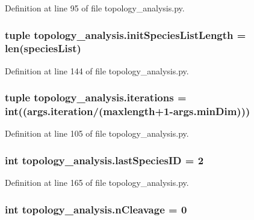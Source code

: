 Definition at line 95 of file topology\+\_\+analysis.\+py.

\hypertarget{a00159_af2370a811b14632a793a28e451be8150}{
\subsubsection[{init\+Species\+List\+Length}]{\setlength{\rightskip}{0pt plus 5cm}tuple topology\+\_\+analysis.\+init\+Species\+List\+Length = len({\bf species\+List})}}\label{a00159_af2370a811b14632a793a28e451be8150}


Definition at line 144 of file topology\+\_\+analysis.\+py.

\hypertarget{a00159_a2117e01e4647cbdecc0ece27cec1cff4}{
\subsubsection[{iterations}]{\setlength{\rightskip}{0pt plus 5cm}tuple topology\+\_\+analysis.\+iterations = int((args.\+iteration/(maxlength+1-\/args.\+min\+Dim)))}}\label{a00159_a2117e01e4647cbdecc0ece27cec1cff4}


Definition at line 105 of file topology\+\_\+analysis.\+py.

\hypertarget{a00159_a1aa5d59ebf308accb3c960b5fd90a445}{
\subsubsection[{last\+Species\+I\+D}]{\setlength{\rightskip}{0pt plus 5cm}int topology\+\_\+analysis.\+last\+Species\+I\+D = 2}}\label{a00159_a1aa5d59ebf308accb3c960b5fd90a445}


Definition at line 165 of file topology\+\_\+analysis.\+py.

\hypertarget{a00159_a9975713682889eae03088e5575e1a0e4}{
\subsubsection[{n\+Cleavage}]{\setlength{\rightskip}{0pt plus 5cm}int topology\+\_\+analysis.\+n\+Cleavage = 0}}\label{a00159_a9975713682889eae03088e5575e1a0e4}



